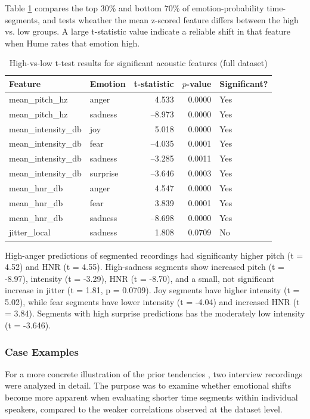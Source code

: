 Table \ref{tab:ttest_full_features} compares the top 30\% and bottom 70\% of emotion-probability time-segments, and tests wheather the mean z-scored feature differs between the high vs. low groups. 
A large t-statistic value indicate a reliable shift in that feature when Hume rates that emotion high. 
\begin{table}[H]
    \centering
    \caption{High-vs-low t-test results for significant acoustic features (full dataset)}
    \begin{tabular}{l l r r l}
      \toprule
      \textbf{Feature} & \textbf{Emotion} & \textbf{t-statistic} & \textbf{\(p\)-value} & \textbf{Significant?} \\
      \midrule
      mean\_pitch\_hz       & anger     &  4.533 & 0.0000 & Yes \\
      mean\_pitch\_hz       & sadness   & –8.973 & 0.0000 & Yes \\
      mean\_intensity\_db   & joy       &  5.018 & 0.0000 & Yes \\
      mean\_intensity\_db   & fear      & –4.035 & 0.0001 & Yes \\
      mean\_intensity\_db   & sadness   & –3.285 & 0.0011 & Yes \\
      mean\_intensity\_db   & surprise  & –3.646 & 0.0003 & Yes \\
      mean\_hnr\_db         & anger     &  4.547 & 0.0000 & Yes \\
      mean\_hnr\_db         & fear      &  3.839 & 0.0001 & Yes \\
      mean\_hnr\_db         & sadness   & –8.698 & 0.0000 & Yes \\
      jitter\_local         & sadness   &  1.808 & 0.0709 & No  \\
      \bottomrule
    \end{tabular}
    \label{tab:ttest_full_features}
  \end{table}
  
  High-anger predictions of segmented recordings had significanty higher pitch (t = 4.52) and HNR (t = 4.55). 
  High-sadness segments show increased pitch (t = -8.97), intensity (t = -3.29), HNR (t = -8.70), and a small, not significant increase in jitter (t = 1.81, p = 0.0709).
  Joy segments have higher intensity (t = 5.02), while fear segments have lower intensity (t = -4.04) and increased HNR (t = 3.84). 
  Segments with high surprise predictions has the moderately low intensity (t = -3.646). 
  

\subsubsection{Case Examples}
For a more concrete illustration of the prior tendencies , two interview recordings were analyzed in detail. The purpose was to examine whether emotional shifts become more apparent when evaluating shorter time segments within individual speakers, compared to the weaker correlations observed at the dataset level.

